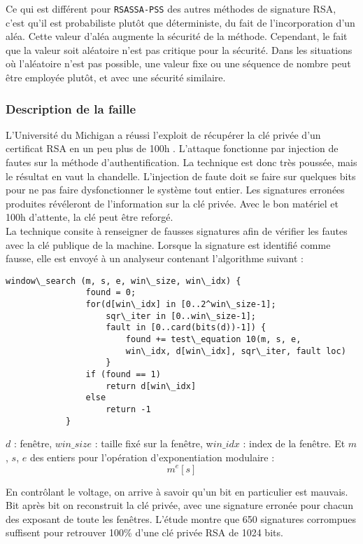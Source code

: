 Ce qui est différent pour \texttt{RSASSA-PSS} des autres méthodes de signature RSA, c'est qu'il est probabiliste plutôt que déterministe, du fait de  l'incorporation d'un aléa. Cette valeur d'aléa augmente la sécurité de la méthode. Cependant, le fait que la valeur soit aléatoire n'est pas critique pour la sécurité. Dans les situations où l'aléatoire n'est pas possible, une valeur fixe ou une séquence de nombre peut être employée plutôt, et avec une sécurité similaire.

		\subsubsection{Description de la faille}
		
			L'Université du Michigan a réussi l'exploit de récupérer la clé privée d'un certificat RSA en un peu plus de 100h \cite{andrea2010RSA} \cite{opensslvuln2010}. 	L'attaque fonctionne par injection de fautes \cite{fault2008lawson} sur la méthode d'authentification. La technique est donc très poussée, mais le résultat en vaut la chandelle. L'injection de faute doit se faire sur quelques bits pour ne pas faire dysfonctionner le système tout entier. Les signatures erronées produites révéleront de l'information sur la clé privée. Avec le bon matériel et 100h d'attente, la clé peut être reforgé.\\

			La technique consite à renseigner de fausses signatures afin de vérifier les fautes avec la clé publique de la machine. Lorsque la signature est identifié comme fausse, elle est envoyé à un analyseur contenant l'algorithme suivant :

			\begin{lstlisting}[style=customc,caption=window\_search.c, label=windowssearch]
			window\_search (m, s, e, win\_size, win\_idx) {
				found = 0;
				for(d[win\_idx] in [0..2^win\_size-1];
					sqr\_iter in [0..win\_size-1];
					fault in [0..card(bits(d))-1]) {
						found += test\_equation 10(m, s, e,
						win\_idx, d[win\_idx], sqr\_iter, fault loc)
					}
				if (found == 1) 
					return d[win\_idx]
				else 
					return -1
			}
			\end{lstlisting}

			$d$ : fenêtre, $win\_size$ : taille fixé sur la fenêtre, w$in\_idx$ : index de la fenêtre. Et $m$, $s$, $e$ des entiers pour l'opération d'exponentiation modulaire :
			$$ m^e [s]$$

			En contrôlant le voltage, on arrive à savoir qu'un bit en particulier est mauvais. Bit après bit on reconstruit la clé privée, avec une signature erronée pour chacun des exposant de toute les fenêtres. L'étude montre que 650 signatures corrompues suffisent pour retrouver 100\% d'une clé privée RSA de 1024 bits. 

